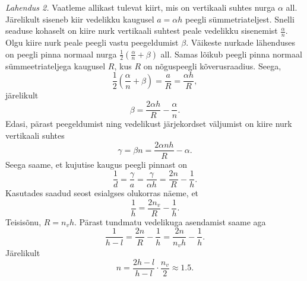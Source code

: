 \emph{Lahendus 2.}
Vaatleme allikast tulevat kiirt, mis on vertikaali suhtes nurga $\alpha$ all. Järelikult siseneb kiir vedelikku kaugusel $a = \alpha h$ peegli sümmetriateljest. Snelli seaduse kohaselt on kiire nurk vertikaali suhtest peale vedelikku sisenemist $\frac{\alpha }{n}$. Olgu kiire nurk peale peegli vastu peegeldumist $\beta$. Väikeste nurkade lähenduses on peegli pinna normaal nurga $\frac{1}{2} (\frac{\alpha}{n} + \beta)$ all. Samas lõikub peegli pinna normaal sümmeetriateljega kaugusel $R$, kus $R$ on nõguspeegli kõverusraadius. Seega,
\[
  \frac{1}{2} \left(\frac{\alpha}{n} + \beta\right) = \frac{a}{R} = \frac{\alpha h}{R},
\]
järelikult
\[
  \beta = \frac{2\alpha h}{R} - \frac{\alpha}{n}.
\]
Edasi, pärast peegeldumist ning vedelikust järjekordset väljumist on kiire nurk vertikaali suhtes
\[
  \gamma = \beta n = \frac{2\alpha nh}{R} - \alpha.
\]
Seega saame, et kujutise kaugus peegli pinnast on
\[
  \frac{1}{d} = \frac{\gamma}{a} = \frac{\gamma}{\alpha h} = \frac{2n}{R}- \frac{1}{h}.
\]
Kasutades saadud seost esialgses olukorras näeme, et
\[
  \frac{1}{h} = \frac{2n_v}{R} - \frac{1}{h}.
\]
Teisisõnu, $R = n_v h$. Pärast tundmatu vedelikuga asendamist saame aga
\[
  \frac{1}{h - l} = \frac{2n}{R} - \frac{1}{h} = \frac{2n}{n_v h} - \frac{1}{h}.
\]
Järelikult
\[
  n = \frac{2h-l}{h - l}\cdot  \frac{n_v}{2} \approx \num{1.5}.
\]
\probend